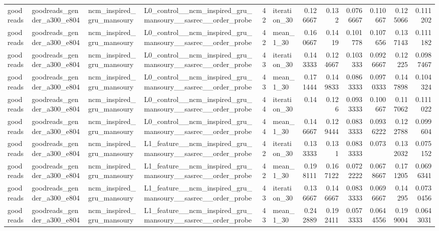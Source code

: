\begin{table}[htbp!]
\begin{tabular}{llllrlrrrrrr}
goodreads & goodreads\_gender\_a300\_e804 & ncm\_inspired\_gru\_mansoury & L0\_control\_\_ncm\_inspired\_gru\_mansoury\_\_sasrec\_\_order\_probe & 42 & iteration\_30 & 0.126667 & 0.132 & 0.0766667 & 0.110667 & 0.125066 & 0.111202 \\
goodreads & goodreads\_gender\_a300\_e804 & ncm\_inspired\_gru\_mansoury & L0\_control\_\_ncm\_inspired\_gru\_mansoury\_\_sasrec\_\_order\_probe & 42 & mean\_1\_30 & 0.160667 & 0.1419 & 0.101778 & 0.107656 & 0.137143 & 0.111182 \\
goodreads & goodreads\_gender\_a300\_e804 & ncm\_inspired\_gru\_mansoury & L0\_control\_\_ncm\_inspired\_gru\_mansoury\_\_sasrec\_\_order\_probe & 43 & iteration\_30 & 0.143333 & 0.124667 & 0.103333 & 0.0926667 & 0.12225 & 0.0987467 \\
goodreads & goodreads\_gender\_a300\_e804 & ncm\_inspired\_gru\_mansoury & L0\_control\_\_ncm\_inspired\_gru\_mansoury\_\_sasrec\_\_order\_probe & 43 & mean\_1\_30 & 0.171444 & 0.149833 & 0.0863333 & 0.0970333 & 0.147898 & 0.104324 \\
goodreads & goodreads\_gender\_a300\_e804 & ncm\_inspired\_gru\_mansoury & L0\_control\_\_ncm\_inspired\_gru\_mansoury\_\_sasrec\_\_order\_probe & 44 & iteration\_30 & 0.14 & 0.126 & 0.0933333 & 0.100667 & 0.117062 & 0.111022 \\
goodreads & goodreads\_gender\_a300\_e804 & ncm\_inspired\_gru\_mansoury & L0\_control\_\_ncm\_inspired\_gru\_mansoury\_\_sasrec\_\_order\_probe & 44 & mean\_1\_30 & 0.146667 & 0.129444 & 0.0833333 & 0.0936222 & 0.122788 & 0.099604 \\
goodreads & goodreads\_gender\_a300\_e804 & ncm\_inspired\_gru\_mansoury & L1\_feature\_\_ncm\_inspired\_gru\_mansoury\_\_sasrec\_\_order\_probe & 42 & iteration\_30 & 0.133333 & 0.131 & 0.0833333 & 0.073 & 0.132032 & 0.075152 \\
goodreads & goodreads\_gender\_a300\_e804 & ncm\_inspired\_gru\_mansoury & L1\_feature\_\_ncm\_inspired\_gru\_mansoury\_\_sasrec\_\_order\_probe & 42 & mean\_1\_30 & 0.198111 & 0.167122 & 0.0722222 & 0.0678667 & 0.171205 & 0.0696341 \\
goodreads & goodreads\_gender\_a300\_e804 & ncm\_inspired\_gru\_mansoury & L1\_feature\_\_ncm\_inspired\_gru\_mansoury\_\_sasrec\_\_order\_probe & 43 & iteration\_30 & 0.136667 & 0.146667 & 0.0833333 & 0.0696667 & 0.14295 & 0.0730456 \\
goodreads & goodreads\_gender\_a300\_e804 & ncm\_inspired\_gru\_mansoury & L1\_feature\_\_ncm\_inspired\_gru\_mansoury\_\_sasrec\_\_order\_probe & 43 & mean\_1\_30 & 0.242889 & 0.192411 & 0.0573333 & 0.0644556 & 0.199004 & 0.0643031 \\

\end{tabular}
\end{table}
